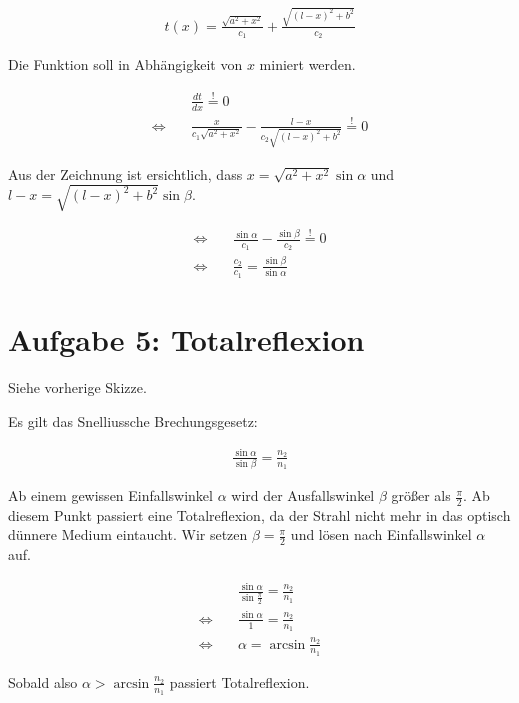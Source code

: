 \documentclass[a4paper,german,12pt,smallheadings]{scrartcl}
\begin{document}
\begin{align*}
  t(x) = \frac{\sqrt{a^2 + x^2}}{c_1} + \frac{\sqrt{(l-x)^2 + b^2}}{c_2}
\end{align*}

Die Funktion soll in Abhängigkeit von $x$ miniert werden.

\begin{align*}
  &\frac{dt}{dx} \overset{!}{=} 0 \\
  \Leftrightarrow\quad&\frac{x}{c_1\sqrt{a^2+x^2}} - \frac{l-x}{c_2 \sqrt{(l-x)^2 + b^2}} \overset{!}{=} 0
\end{align*}

Aus der Zeichnung ist ersichtlich, dass $x = \sqrt{a^2 + x^2} \sin \alpha$ und
$l-x = \sqrt{(l-x)^2 + b^2} \sin \beta$.

\begin{align*}
  \Leftrightarrow\quad&\frac{\sin \alpha}{c_1} - \frac{\sin \beta}{c_2} \overset{!}{=} 0 \\
  \Leftrightarrow\quad&\frac{c_2}{c_1} = \frac{\sin \beta}{\sin \alpha}
\end{align*}

\section*{Aufgabe 5: Totalreflexion}

Siehe vorherige Skizze.

Es gilt das Snelliussche Brechungsgesetz:

\begin{align*}
  \frac{\sin \alpha}{\sin \beta} = \frac{n_2}{n_1}
\end{align*}

Ab einem gewissen Einfallswinkel $\alpha$ wird der Ausfallswinkel $\beta$
größer als $\frac{\pi}{2}$. Ab diesem Punkt passiert eine Totalreflexion, da
der Strahl nicht mehr in das optisch dünnere Medium eintaucht. Wir setzen $\beta = \frac{\pi}{2}$ und lösen nach Einfallswinkel $\alpha$ auf.


\begin{align*}
  &\frac{\sin \alpha}{\sin \frac{\pi}{2}} = \frac{n_2}{n_1} \\
  \Leftrightarrow\quad&\frac{\sin \alpha}{1} = \frac{n_2}{n_1} \\
  \Leftrightarrow\quad&\alpha = \arcsin \frac{n_2}{n_1}
\end{align*}

Sobald also $\alpha > \arcsin \frac{n_2}{n_1}$ passiert Totalreflexion.
\end{document}

